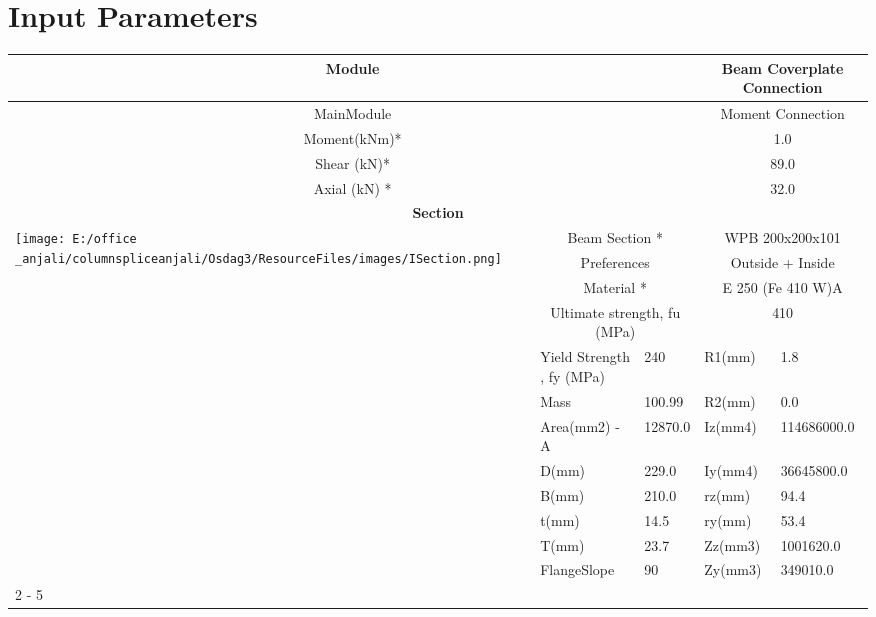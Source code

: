 \documentclass{article}%
\begin{document}
%
\normalsize%
\pagestyle{header}%
\section{Input Parameters}%
\label{sec:InputParameters}%
\renewcommand{\arraystretch}{1.2}%
\begin{longtable}{|p{5cm}|p{2cm}|p{2cm}|p{2cm}|p{5cm}|}%
\hline%
\hline%
\multicolumn{3}{|c|}{Module}&\multicolumn{2}{|c|}{Beam Coverplate Connection}\\%
\hline%
\hline%
\multicolumn{3}{|c|}{MainModule}&\multicolumn{2}{|c|}{Moment Connection}\\%
\hline%
\hline%
\multicolumn{3}{|c|}{Moment(kNm)*}&\multicolumn{2}{|c|}{1.0}\\%
\hline%
\hline%
\multicolumn{3}{|c|}{Shear (kN)*}&\multicolumn{2}{|c|}{89.0}\\%
\hline%
\hline%
\multicolumn{3}{|c|}{Axial (kN) *}&\multicolumn{2}{|c|}{32.0}\\%
\hline%
\hline%
\multicolumn{5}{|c|}{\textbf{Section}}\\%
\hline%
\hline%
\multirow{12}{*}{\texttt{[image: E:/office \_anjali/columnspliceanjali/Osdag3/ResourceFiles/images/ISection.png]}}&\multicolumn{2}{|c|}{Beam Section *}&\multicolumn{2}{|c|}{WPB 200x200x101}\\%
\cline{2%
-%
5}%
&\multicolumn{2}{|c|}{Preferences}&\multicolumn{2}{|c|}{Outside + Inside}\\%
\cline{2%
-%
5}%
&\multicolumn{2}{|c|}{Material *}&\multicolumn{2}{|c|}{E 250 (Fe 410 W)A}\\%
\cline{2%
-%
5}%
&\multicolumn{2}{|c|}{Ultimate strength, fu (MPa)}&\multicolumn{2}{|c|}{410}\\%
\cline{2%
-%
5}%
&Yield Strength , fy (MPa)&240&R1(mm)&1.8\\%
\cline{2%
-%
5}%
&Mass&100.99&R2(mm)&0.0\\%
\cline{2%
-%
5}%
&Area(mm2) {-} A&12870.0&Iz(mm4)&114686000.0\\%
\cline{2%
-%
5}%
&D(mm)&229.0&Iy(mm4)&36645800.0\\%
\cline{2%
-%
5}%
&B(mm)&210.0&rz(mm)&94.4\\%
\cline{2%
-%
5}%
&t(mm)&14.5&ry(mm)&53.4\\%
\cline{2%
-%
5}%
&T(mm)&23.7&Zz(mm3)&1001620.0\\%
\cline{2%
-%
5}%
&FlangeSlope&90&Zy(mm3)&349010.0\\%
\cline{2%
-%
5}%
\hline%
\multicolumn{5}{|c|}{\textbf{Bolt Details}}\\%

\end{longtable}
\end{document}
